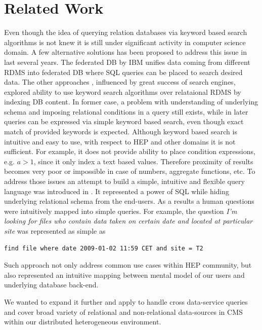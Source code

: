 \documentclass[a4paper]{jpconf}
\begin{document}
\section{Related Work\label{RelatedWork}}
Even though the idea of querying relation databases via keyword based search
algorithms is not knew it is still under significant activity in computer
science domain. A few alternative solutions has been proposed to address this issue
in last several years. The federated DB \cite{FedDB} by IBM unifies data coming 
from different RDMS into federated DB where SQL queries can be placed to search desired
data. The other approaches \cite{DBXplorer, QueryAnswer}, influenced by great success
of search engines, explored ability to use keyword search algorithms over relataional RDMS
by indexing DB content. In former case, a problem with understanding 
of underlying schema and imposing relational conditions in a query still exists, while 
in later queries can be expressed via simple keyword based search, even though exact match
of provided keywords is expected. Although keyword based search is
intuitive and easy to use, with respect to HEP and other domains it is not sufficient. 
For example, it does not provide ability to place condition expressions,
e.g. $a > 1$, since
it only index a text based values. Therefore proximity of results becomes very poor
or impossible in case of numbers, aggregate functions, etc. To address those issues
an attempt to build a simple, intuitive and flexible query language was introduced
in \cite{DBS-QL, AMI}.
It represented a power of SQL while
hiding underlying relational schema from the end-users. As a results
a human questions were intuitively mapped into simple queries. For example,
the question
{\it I'm looking for files who contain data taken on certain date and located at
particular site} was represented as simple as \cite{DBS-QL}
\begin{verbatim}
find file where date 2009-01-02 11:59 CET and site = T2
\end{verbatim}
Such approach not only address common use cases within HEP community, but also
represented an intuitive mapping between mental model of our users and 
underlying database back-end.

We wanted to expand it further and apply to handle cross data-service queries and
cover broad variety of relational and non-relational data-sources in 
CMS within our distributed heterogeneous environment.
\end{document}
